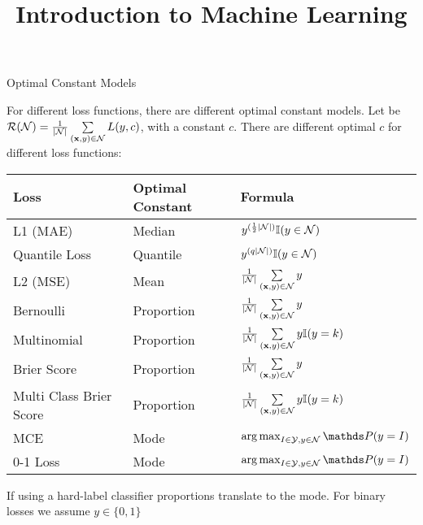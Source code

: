 \documentclass[11pt,compress,t,notes=noshow, xcolor=table]{beamer}
\title{Introduction to Machine Learning}
\institute{\href{https://compstat-lmu.github.io/lecture_i2ml/}{compstat-lmu.github.io/lecture\_i2ml}}
\date{}
\begin{document}
\sloppy

\begin{vbframe}{Optimal Constant Models}

For different loss functions, there are different optimal constant models.
Let be $\mathcal{R}(\mathcal{N}) = \frac{1}{|\mathcal{N}|} \sum\limits_{(\mathbf{x},y) \in \mathcal{N}} L(y, c)$, with a constant $c$.
There are different optimal $c$ for different loss functions:

\begin{table}[]
\tiny
\begin{tabular}{lll}
Loss          & Optimal Constant & Formula \\
\hline
L1 (MAE)      & Median            &    $y^{(\frac{1}{2}|\mathcal{N}|)} \mathbb{I}(y \in \mathcal{N}) $  \\
Quantile Loss & Quantile         &    $y^{(q |\mathcal{N}|)} \mathbb{I}(y \in \mathcal{N}) $ \\
L2 (MSE)      & Mean          &    $\frac{1}{|\mathcal{N}|} \sum\limits_{(\mathbf{x},y) \in \mathcal{N}} y$  \\
Bernoulli & Proportion    &  $\frac{1}{|\mathcal{N}|} \sum\limits_{(\mathbf{x},y) \in \mathcal{N}} y$    \\
Multinomial & Proportion & $\frac{1}{|\mathcal{N}|} \sum\limits_{(\mathbf{x},y) \in \mathcal{N}} y  \mathbb{I}(y = k) $ \\
Brier Score & Proportion       & $\frac{1}{|\mathcal{N}|} \sum\limits_{(\mathbf{x},y) \in \mathcal{N}} y$   \\
Multi Class Brier Score & Proportion & $\frac{1}{|\mathcal{N}|} \sum\limits_{(\mathbf{x},y) \in \mathcal{N}} y  \mathbb{I}(y = k)   $ \\
  MCE & Mode & $\argmax_{I \in \Yspace, y \in \Np} \P(y=I)$ \\
0-1 Loss & Mode  & $\argmax_{I \in \Yspace, y \in \Np} \P(y=I)$
\end{tabular}
\end{table}


If using a hard-label classifier proportions translate to the mode.
For binary losses we assume $y \in \{0, 1\}$

\end{vbframe}
\end{document}
